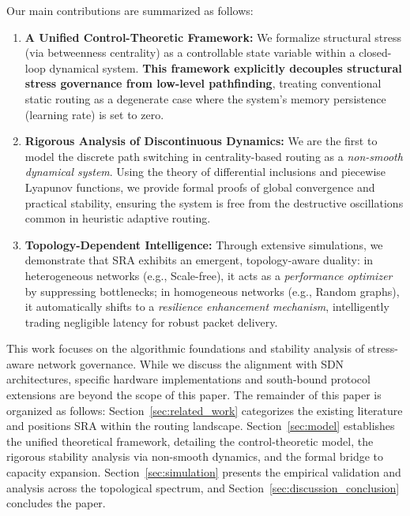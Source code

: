 \documentclass{ccjnl}
\begin{document}
Our main contributions are summarized as follows:
\begin{enumerate}
    \item \textbf{A Unified Control-Theoretic Framework:} We formalize structural stress (via betweenness centrality) as a controllable state variable within a closed-loop dynamical system. \textbf{This framework explicitly decouples structural stress governance from low-level pathfinding}, treating conventional static routing as a degenerate case where the system's memory persistence (learning rate) is set to zero.
    
    \item \textbf{Rigorous Analysis of Discontinuous Dynamics:} We are the first to model the discrete path switching in centrality-based routing as a \textit{non-smooth dynamical system}. Using the theory of differential inclusions and piecewise Lyapunov functions, we provide formal proofs of global convergence and practical stability, ensuring the system is free from the destructive oscillations common in heuristic adaptive routing.
    
    \item \textbf{Topology-Dependent Intelligence:} Through extensive simulations, we demonstrate that SRA exhibits an emergent, topology-aware duality: in heterogeneous networks (e.g., Scale-free), it acts as a \textit{performance optimizer} by suppressing bottlenecks; in homogeneous networks (e.g., Random graphs), it automatically shifts to a \textit{resilience enhancement mechanism}, intelligently trading negligible latency for robust packet delivery.
\end{enumerate}

This work focuses on the algorithmic foundations and stability analysis of stress-aware network governance. 
While we discuss the alignment with SDN architectures, specific hardware implementations and south-bound protocol extensions are beyond the scope of this paper. The remainder of this paper is organized as follows: Section~\ref{sec:related_work} categorizes the existing literature and positions SRA within the routing landscape. 
Section~\ref{sec:model} establishes the unified theoretical framework, detailing the control-theoretic model, the rigorous stability analysis via non-smooth dynamics, and the formal bridge to capacity expansion. 
Section~\ref{sec:simulation} presents the empirical validation and analysis across the topological spectrum, and Section~\ref{sec:discussion_conclusion} concludes the paper.
\end{document}
